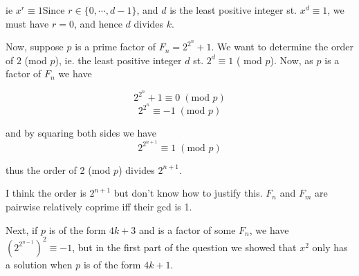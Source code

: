 \documentclass[a4paper]{article}
\begin{document}
ie $ x^{r} \equiv 1 $Since $ r \in \{  0,\cdots,d-1\} $, and $ d $ is the least positive integer st. $ x^{d} \equiv 1 $, we must have $ r = 0 $, and hence $ d $ divides $ k $.

Now, suppose $ p  $ is a prime factor of $ F_{n} = 2^{2^{n}} + 1 $. We want to determine the order of $ 2 $ (mod $ p $), ie. the least positive integer $ d $ st. $ 2^{d} \equiv 1 $ ( mod $ p $). Now, as $ p $ is a factor of $ F_{n} $ we have

\[ 2^{2^{n}} + 1 \equiv 0 \; (\text{mod }p) \]
\[ 2^{2^{n}} \equiv -1 \; (\text{mod } p) \]

and by squaring both sides we have
\[ 2^{2^{n+1}} \equiv 1 \; (\text{mod } p) \]

thus the order of 2 (mod $ p $) divides $ 2^{n+1} $.

I think the order is $ 2^{n+1} $ but don't know how to justify this.
$ F_{n} $ and $ F_{m} $ are pairwise relatively coprime iff their gcd is 1. 

Next, if $ p $ is of the form $ 4k + 3 $ and is a factor of some $ F_{n} $, we have $ \left( 2^{2^{n-1}} \right)^{2} \equiv -1 $, but in the first part of the question we showed that $ x^{2} $ only has a solution when $ p $ is of the form $ 4k + 1 $.
\end{document}
